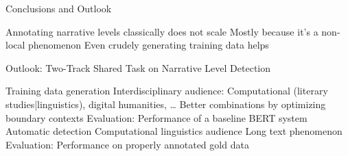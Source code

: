 \documentclass[aspectratio=169]{beamer}
\begin{document}
\begin{frame}{Conclusions and Outlook}
\begin{outline}
\1 Annotating narrative levels classically does not scale
\2 Mostly because it's a non-local phenomenon
\1 Even crudely generating training data helps
\end{outline}
\pause
\begin{block}{Outlook: Two-Track Shared Task on Narrative Level Detection}
\renewcommand\outlinei{enumerate}
\begin{outline}
\1 Training data generation
\2 Interdisciplinary audience: Computational (literary studies|linguistics), digital humanities, \dots 
\2 Better combinations by optimizing boundary contexts
\2 Evaluation: Performance of a baseline BERT system
\1 Automatic detection
\2 Computational linguistics audience
\2 Long text phenomenon
\2 Evaluation: Performance on properly annotated gold data
\end{outline}
\end{block}

\end{frame}


\begin{frame}[plain]
\end{frame}

\appendix
\end{document}
